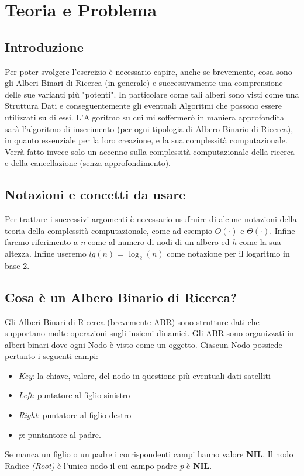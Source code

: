 \section{Teoria e Problema}
\label{sezione2}
\subsection{Introduzione}
Per poter svolgere l'esercizio è necessario capire, anche se brevemente, cosa sono gli Alberi Binari di Ricerca (in generale) e successivamente una comprensione delle sue varianti più "potenti". 
In particolare come tali alberi sono visti come una Struttura Dati e conseguentemente gli eventuali Algoritmi che possono essere utilizzati su di essi.
L'Algoritmo su cui mi soffermerò in maniera approfondita sarà l'algoritmo di inserimento (per ogni tipologia di Albero Binario di Ricerca), in quanto essenziale per la loro creazione, e la sua complessità computazionale. Verrà fatto invece solo un accenno sulla complessità computazionale della ricerca e della cancellazione (senza approfondimento).
\subsection{Notazioni e concetti da usare}
Per trattare i successivi argomenti è necessario usufruire di alcune notazioni della teoria della complessità computazionale, come ad esempio $O(\cdot)$ e $\Theta(\cdot)$. Infine faremo riferimento a \textit{n} come al numero di nodi di un albero ed \textit{h} come la sua altezza. Infine useremo $lg(n)$ = $\log_{2}(n)$ come notazione per il logaritmo in base 2.
\subsection{Cosa è un Albero Binario di Ricerca?}
Gli Alberi Binari di Ricerca (brevemente ABR) sono strutture dati che supportano molte operazioni sugli insiemi dinamici. Gli ABR sono organizzati in alberi binari dove ogni Nodo è visto come un oggetto. Ciascun Nodo possiede pertanto i seguenti campi:
\begin{itemize}
	\item \textit{Key}: la chiave, valore, del nodo in questione più eventuali dati satelliti
	\item \textit{Left}: puntatore al figlio sinistro
	\item \textit{Right}: puntatore al figlio destro
	\item \textit{p}: puntantore al padre.
\end{itemize}
Se manca un figlio o un padre i corrispondenti campi hanno valore \textbf{NIL}. Il nodo Radice \textit{(Root)} è l'unico nodo il cui campo padre \textit{p} è \textbf{NIL}.

